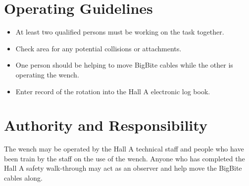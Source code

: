 \section{Operating Guidelines}

\begin{itemize}
\item{At least two qualified persons must be working on the task together.}
\item{Check area for any potential collisions or attachments.}
\item{One person should be helping to move BigBite cables while the other is operating
the wench.}
\item{Enter record of the rotation into the Hall A electronic log book.}
\end{itemize}

\section{Authority and Responsibility}

The wench may be operated by the Hall A technical staff and people who have been train by the
staff on the use of the wench.  Anyone who has completed the Hall A safety walk-through may act 
as an observer and help move the BigBite cables along.

